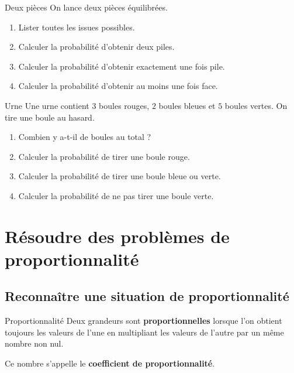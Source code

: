 \documentclass[11pt,a4paper]{article}
\begin{document}
\begin{exercisebox}{Deux pièces}
On lance deux pièces équilibrées.

\begin{enumerate}
    \item Lister toutes les issues possibles.
    \item Calculer la probabilité d'obtenir deux piles.
    \item Calculer la probabilité d'obtenir exactement une fois pile.
    \item Calculer la probabilité d'obtenir au moins une fois face.
\end{enumerate}
\end{exercisebox}

\begin{exercisebox}{Urne}
Une urne contient $3$ boules rouges, $2$ boules bleues et $5$ boules vertes. On tire une boule au hasard.

\begin{enumerate}
    \item Combien y a-t-il de boules au total ?
    \item Calculer la probabilité de tirer une boule rouge.
    \item Calculer la probabilité de tirer une boule bleue ou verte.
    \item Calculer la probabilité de ne pas tirer une boule verte.
\end{enumerate}
\end{exercisebox}

\newpage

\section{Résoudre des problèmes de proportionnalité}

\subsection{Reconnaître une situation de proportionnalité}

\begin{definitionbox}{Proportionnalité}
Deux grandeurs sont \textbf{proportionnelles} lorsque l'on obtient toujours les valeurs de l'une en multipliant les valeurs de l'autre par un même nombre non nul.

Ce nombre s'appelle le \textbf{coefficient de proportionnalité}.
\end{definitionbox}
\end{document}
